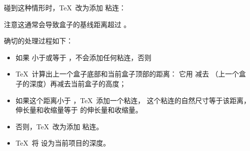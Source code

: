 \documentclass{book}
\begin{document}
碰到这种情形时，\TeX\ 改为添加  粘连：
\begin{quotation}
  \figthree
\end{quotation}
注意这通常会导致盒子的基线距离超过 。

确切的处理过程如下：
\begin{itemize}
\item 如果  小于或等于 \n{-1000pt}，不会添加任何粘连，否则
\item \TeX\ 计算出上一个盒子底部和当前盒子顶部的距离：
它用  减去 （上一个盒子的深度）再减去当前盒子的高度；
\item 如果这个距离小于 ，\TeX\ 添加一个粘连，
这个粘连的自然尺寸等于该距离，伸长量和收缩量等于  的伸长量和收缩量。
\item 否则，\TeX\ 改为添加  粘连。
\item \TeX\ 将  设为当前项目的深度。
\end{itemize}
\end{document}
